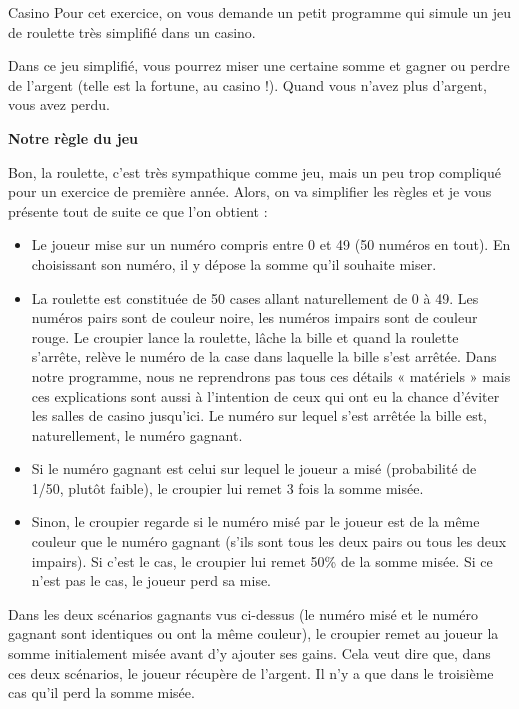 \begin{Exercice}{Casino}
	Pour cet exercice,
	on vous demande un petit programme qui simule un jeu de roulette
	très simplifié dans un casino.
	
	Dans ce jeu simplifié, vous pourrez miser une certaine somme 
	et gagner ou perdre de l'argent (telle est la fortune, au casino !). 
	Quand vous n'avez plus d'argent, vous avez perdu.

	\textbf{Notre règle du jeu}

	Bon, la roulette, c'est très sympathique comme jeu, 
	mais un peu trop compliqué pour un exercice de première année.
	Alors, on va simplifier les règles et je vous présente tout de suite 
	ce que l'on obtient :
	\begin{itemize}
	\item
		Le joueur mise sur un numéro compris entre 0 et 49 (50 numéros en tout). 
		En choisissant son numéro, il y dépose la somme qu'il souhaite miser.
	\item
		La roulette est constituée de 50 cases allant naturellement de 0 à 49. 
		Les numéros pairs sont de couleur noire, 
		les numéros impairs sont de couleur rouge. 
		Le croupier lance la roulette, 
		lâche la bille et quand la roulette s'arrête, 
		relève le numéro de la case dans laquelle la bille s'est arrêtée. 
		Dans notre programme, nous ne reprendrons pas tous ces détails 
		« matériels » mais ces explications sont aussi à l'intention 
		de ceux qui ont eu la chance d'éviter les salles de casino jusqu'ici. 
		Le numéro sur lequel s'est arrêtée la bille est, naturellement, 
		le numéro gagnant.
	\item
		Si le numéro gagnant est celui sur lequel le joueur a misé 
		(probabilité de 1/50, plutôt faible), 
		le croupier lui remet 3 fois la somme misée.
	\item
		Sinon, le croupier regarde si le numéro misé par le joueur 
		est de la même couleur que le numéro gagnant 
		(s'ils sont tous les deux pairs ou tous les deux impairs). 
		Si c'est le cas, le croupier lui remet 50\% de la somme misée. 
		Si ce n'est pas le cas, le joueur perd sa mise.
	\end{itemize}
	
	Dans les deux scénarios gagnants vus ci-dessus 
	(le numéro misé et le numéro gagnant sont identiques ou ont la même couleur), 
	le croupier remet au joueur la somme initialement misée avant d'y ajouter ses gains. 
	Cela veut dire que, dans ces deux scénarios, le joueur récupère de l'argent. 
	Il n'y a que dans le troisième cas qu'il perd la somme misée. 
\end{Exercice}
